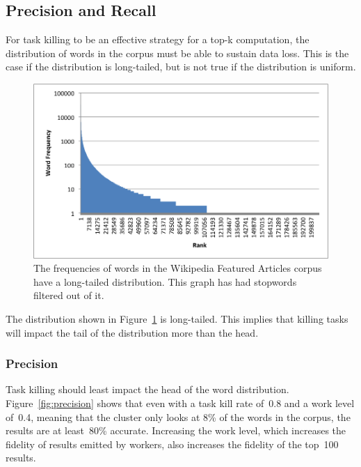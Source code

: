 \documentclass[12pt,twocolumn]{article}
\begin{document}
\subsection{Precision and Recall}
For task killing to be an effective strategy for a top-k computation, the
distribution of words in the corpus must be able to sustain data loss. This is the case
if the distribution is long-tailed, but is not true if the distribution is uniform.

\begin{figure}
\includegraphics[width=\linewidth]{long-tail-ranks.png}
\caption{The frequencies of words in the Wikipedia Featured Articles corpus have a long-tailed distribution. This graph has had stopwords~\cite{stopwords} filtered out of it.}
\label{fig:wordDist}
\end{figure}

The distribution shown in Figure~\ref{fig:wordDist} is long-tailed. This implies that killing
tasks will impact the tail of the distribution more than the head.

\subsubsection{Precision}
Task killing should least impact the head of the word distribution.
Figure~\ref{fig:precision} shows that even with a task kill rate of~0.8 and a work level of~0.4,
meaning that the cluster only looks at 8\% of the words in the corpus, the results
are at least~80\% accurate. Increasing the work level, which increases the fidelity of
results emitted by workers, also increases the fidelity of the top~100 results.
\end{document}
